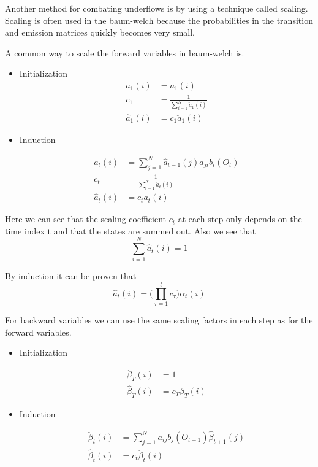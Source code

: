 Another method for combating underflows is by using a technique called scaling.
Scaling is often used in the baum-welch because the probabilities in the
transition and emission matrices quickly becomes very small.\cite[p.5]{shen2008}

A common way to scale the forward variables in baum-welch is.

\begin{itemize}
\item Initialization
\begin{align*}
\ddot{a}_1(i) &= a_1(i) \\
c_1 &= \frac{1}{\sum_{i=1}^N \ddot{a}_1(i)} \\
{\hat{a}}_1(i) &= c_1 \ddot{a}_1(i)
\end{align*}

\item Induction

\begin{align*}
\ddot{a}_t(i) &= \sum_{j=1}^N \hat{a}_{t-1}(j) a_{ji} b_i(O_t)  \\
c_t &= \frac{1}{\sum_{i=1}^N \ddot{a}_t(i)} \\
{\hat{a}}_t(i) &= c_t \ddot{a}_t(i)
\end{align*}
\end{itemize}

Here we can see that the scaling coefficient $c_t$ at each step only depends on 
the time index t and that the states are summed out.
Also we see that
$$\sum_{i=1}^N \hat{a}_t(i) = 1$$

By induction it can be proven that
$$\hat{a}_t(i) = \bigg(\prod_{\tau=1}^t c_{\tau}\bigg)\alpha_t(i)$$
\cite[p.5]{shen2008}

For backward variables we can use the same scaling factors in each step as for
the forward variables.

\begin{itemize}
\item Initialization

\begin{align*}
\ddot{\beta}_T(i) &= 1 \\
\hat{\beta}_T(i) &= c_T \ddot{\beta}_T(i)
\end{align*}
\item Induction

\begin{align*}
\ddot{\beta}_t(i) &= \sum_{j=1}^N a_{ij}b_j(O_{t+1})\hat{\beta}_{t+1}(j) \\
\hat{\beta}_t(i) &= c_t \ddot{\beta}_t(i)
\end{align*}

\end{itemize}
\cite[p.6]{shen2008}

%
